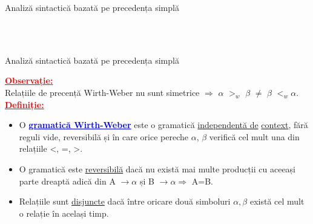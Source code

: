 \documentclass[pdf]{beamer}
\begin{document}
\begin{frame}{Analiză sintactică bazată pe precedența simplă}

\begin{center}
\textcolor{white}{fill}\\
\textcolor{white}{fill}\\

\end{center}
\end{frame}



\begin{frame}{Analiză sintactică bazată pe precedența simplă}

\textcolor{red}{\underline{\textbf{Observație:}}}\\
{\small Relațiile de precență Wirth-Weber nu sunt simetrice $\Rightarrow$ $\alpha$ $>_{w}$ $\beta$ $\neq$ $\beta$ $<_{w} \alpha .$}
\textcolor{red}{\underline{\textbf{Definiție:}}}\\

\begin{itemize}
 \item {\small O \textcolor{blue}{\underline{\textbf{gramatică Wirth-Weber}}} este o gramatică \underline{independentă de} \underline{ context}, fără reguli vide, reversibilă și în care orice pereche $\alpha$, $\beta$ verifică cel mult una din relațiile <, =, >.}
 
 \item {\small O gramatică este \underline{reversibilă} dacă nu există mai multe producții cu aceeași parte dreaptă adică din A $\rightarrow \alpha$ și B $\rightarrow \alpha \Rightarrow$ A=B.}
 \item {\small Relațiile sunt \underline{disjuncte} dacă între oricare două simboluri $\alpha, \beta$ există cel mult o relație în același timp.}

\end{itemize}
\end{frame}
\end{document}
